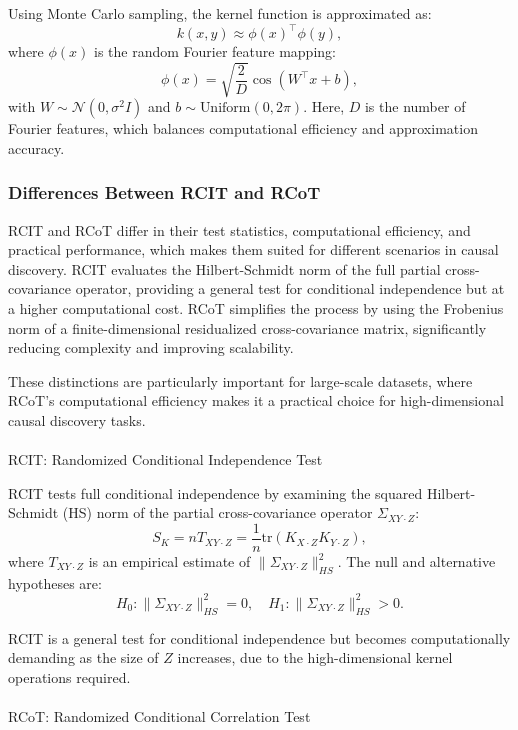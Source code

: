 \documentclass[
]{article}
\makeatletter
\let\oldparagraph\paragraph
\renewcommand{\paragraph}{
    \@ifstar
      \xxxParagraphStar
      \xxxParagraphNoStar
  }
\newcommand{\xxxParagraphStar}[1]{\oldparagraph*{#1}\mbox{}}
\newcommand{\xxxParagraphNoStar}[1]{\oldparagraph{#1}\mbox{}}
\makeatother
\begin{document}
Using Monte Carlo sampling, the kernel function is approximated as: \[
k(x, y) \approx \phi(x)^\top \phi(y),
\] where \(\phi(x)\) is the random Fourier feature mapping: \[
\phi(x) = \sqrt{\frac{2}{D}} \cos(W^\top x + b),
\] with \(W \sim \mathcal{N}(0, \sigma^2 I)\) and
\(b \sim \text{Uniform}(0, 2\pi)\). Here, \(D\) is the number of Fourier
features, which balances computational efficiency and approximation
accuracy.

\subsubsection{Differences Between RCIT and
RCoT}\label{differences-between-rcit-and-rcot}

RCIT and RCoT differ in their test statistics, computational efficiency,
and practical performance, which makes them suited for different
scenarios in causal discovery. RCIT evaluates the Hilbert-Schmidt norm
of the full partial cross-covariance operator, providing a general test
for conditional independence but at a higher computational cost. RCoT
simplifies the process by using the Frobenius norm of a
finite-dimensional residualized cross-covariance matrix, significantly
reducing complexity and improving scalability.

These distinctions are particularly important for large-scale datasets,
where RCoT's computational efficiency makes it a practical choice for
high-dimensional causal discovery tasks.

\paragraph{RCIT: Randomized Conditional Independence
Test}\label{rcit-randomized-conditional-independence-test}

RCIT tests full conditional independence by examining the squared
Hilbert-Schmidt (HS) norm of the partial cross-covariance operator
\(\Sigma_{XY \cdot Z}\): \[
S_K = n T_{XY \cdot Z} = \frac{1}{n} \text{tr}(K_{X \cdot Z} K_{Y \cdot Z}),
\] where \(T_{XY \cdot Z}\) is an empirical estimate of
\(\|\Sigma_{XY \cdot Z}\|^2_{HS}\). The null and alternative hypotheses
are: \[
H_0: \|\Sigma_{XY \cdot Z}\|^2_{HS} = 0, \quad H_1: \|\Sigma_{XY \cdot Z}\|^2_{HS} > 0.
\]

RCIT is a general test for conditional independence but becomes
computationally demanding as the size of \(Z\) increases, due to the
high-dimensional kernel operations required.

\paragraph{RCoT: Randomized Conditional Correlation
Test}\label{rcot-randomized-conditional-correlation-test}
\end{document}
